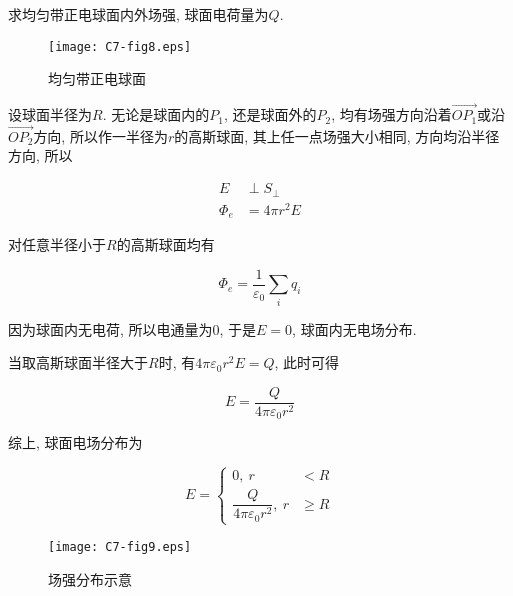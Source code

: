 \begin{example}
	求均匀带正电球面内外场强, 球面电荷量为$Q$.
	
	\begin{figure}[h]
		\centering
		\texttt{[image: C7-fig8.eps]}
		\caption{均匀带正电球面}
	\end{figure}
	
	\begin{solution}
		设球面半径为$R$. 无论是球面内的$P_1$, 还是球面外的$P_2$, 均有场强方向沿着$\overrightarrow{OP_1}$或沿$\overrightarrow{OP_2}$方向, 所以作一半径为$r$的高斯球面, 其上任一点场强大小相同, 方向均沿半径方向, 所以
		
		\begin{align*}
			E &\perp S_{\bot} \\ 
			\varPhi_e &= 4 \pi r^2 E 
		\end{align*}
		
		对任意半径小于$R$的高斯球面均有
		
		\begin{equation*}
			\varPhi_e = \dfrac{1}{\varepsilon_0}\sum\limits_{i} q_i 
		\end{equation*}
	    
	    因为球面内无电荷, 所以电通量为0, 于是$E=0$, 球面内无电场分布. 
		
		当取高斯球面半径大于$R$时, 有$4\pi\varepsilon_0 r^2 E = Q$, 此时可得
		
		\begin{equation*}
			E = \dfrac{Q}{4\pi\varepsilon_0 r^2}
		\end{equation*}

		综上, 球面电场分布为
		
		\begin{equation*}
			E = \begin{cases}
				0, ~r &< R \\
				\dfrac{Q}{4\pi\varepsilon_0 r^2}, ~r &\geq R 
			\end{cases}
		\end{equation*}
		
		\begin{figure}[h]
			\centering
			\texttt{[image: C7-fig9.eps]}
			\caption{场强分布示意}
			\label{C7-fig9}
		\end{figure}
		
	\end{solution}
	
\end{example}

